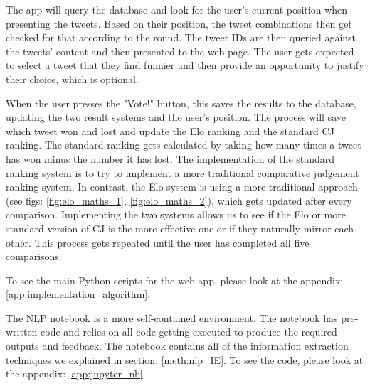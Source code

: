 	The app will query the database and look for the user's current position when presenting the tweets. Based on their position, the tweet combinations then get checked for that according to the round. The tweet IDs are then queried against the tweets' content and then presented to the web page. The user gets expected to select a tweet that they find funnier and then provide an opportunity to justify their choice, which is optional.   
	
	When the user presses the "Vote!" button, this saves the results to the database, updating the two result systems and the user's position. The process will save which tweet won and lost and update the Elo ranking and the standard CJ ranking. The standard ranking gets calculated by taking how many times a tweet has won minus the number it has lost. The implementation of the standard ranking system is to try to implement a more traditional comparative judgement ranking system. In contrast, the Elo system is using a more traditional approach (see figs: \ref{fig:elo_maths_1}, \ref{fig:elo_maths_2}), which gets updated after every comparison. Implementing the two systems allows us to see if the Elo or more standard version of CJ is the more effective one or if they naturally mirror each other. This process gets repeated until the user has completed all five comparisons.
	
	To see the main Python scripts for the web app, please look at the appendix: \ref{app:implementation_algorithm}.
	
	The NLP notebook is a more self-contained environment. The notebook has pre-written code and relies on all code getting executed to produce the required outputs and feedback. The notebook contains all of the information extraction techniques we explained in section: \ref{meth:nlp_IE}. To see the code, please look at the appendix: \ref{app:jupyter_nb}.
	
		
	
	
	
	
	